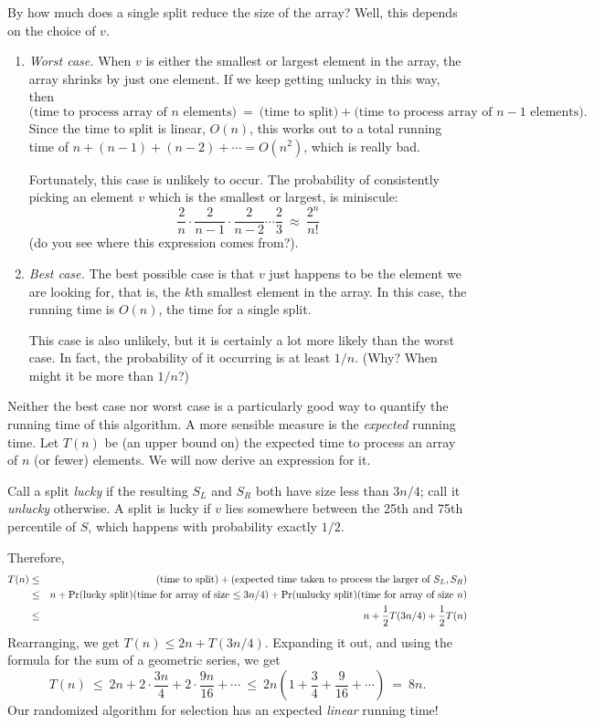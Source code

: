 \documentclass{report}
\theoremstyle{plain}
\theoremstyle{definition}
\newcommand{\pr}{\mbox{\rm Pr}}
\begin{document}
By how much does a single split reduce the size of the array? Well, this depends
on the choice of $v$.

\begin{enumerate}
\item {\it Worst case.} When $v$ is either the smallest or largest element in the
array, the array shrinks by just one element. If we keep getting unlucky in
this way, then
$$
\mbox{(time to process array of $n$ elements)}
\ = \ 
\mbox{(time to split)} + \mbox{(time to process array of $n-1$ elements)}.
$$
Since the time to split is linear, $O(n)$, this works out to a total running
time of $n + (n-1) + (n-2) + \cdots = O(n^2)$, which is really bad.

Fortunately, this case is unlikely to occur. The probability of consistently
picking an element $v$ which is the smallest or largest, is miniscule:
$$ \frac{2}{n} \cdot \frac{2}{n-1} \cdot \frac{2}{n-2} \cdots \frac{2}{3}
\ \approx \ 
\frac{2^n}{n!}
$$
(do you see where this expression comes from?).

\item {\it Best case.} The best possible case is that $v$ just happens to be 
the element we are looking for, that is, the $k$th smallest element in the array. 
In this case, the running time is $O(n)$, the time for a single split.

This case is also unlikely, but it is certainly a lot more likely than the worst
case. In fact, the probability of it occurring is at least $1/n$. (Why? When
might it be more than $1/n$?)

\end{enumerate}

Neither the best case nor worst case is a particularly good way to quantify the 
running time of this algorithm. A more sensible measure is the {\it expected} 
running time. Let $T(n)$ be (an upper bound on) the expected time to 
process an array of $n$ (or fewer) elements. We will now derive an expression
for it.

Call a split {\it lucky} if the resulting $S_L$ and $S_R$ both have size less 
than $3n/4$; call it {\it unlucky} otherwise. A split is lucky if $v$ lies 
somewhere between the 25th and 75th percentile of $S$, which happens with
probability exactly $1/2$.

Therefore,
\begin{eqnarray*}
T(n) 
& \leq &
\mbox{(time to split)} + \mbox{(expected time taken to process the larger of $S_L, S_R$)} \\
& \leq &
n + \pr{\mbox{(lucky split)}} \mbox{(time for array of size $\leq 3n/4$)}
 + \pr{\mbox{(unlucky split)}} \mbox{(time for array of size $n$)} \\
& \leq &
n + \frac{1}{2} T(3n/4) + \frac{1}{2} T(n)
\end{eqnarray*}
Rearranging, we get $T(n) \leq 2n + T(3n/4)$. Expanding it out, and using the formula
for the sum of a geometric series, we get
$$
T(n) 
\ \leq \ 
2n + 2 \cdot \frac{3n}{4} + 2 \cdot \frac{9n}{16} + \cdots 
\ \leq \ 
2n \left( 1 + \frac{3}{4} + \frac{9}{16} + \cdots \right) 
\ = \  
8n.
$$
Our randomized algorithm for selection has an expected {\it linear} running time!
\end{document}
